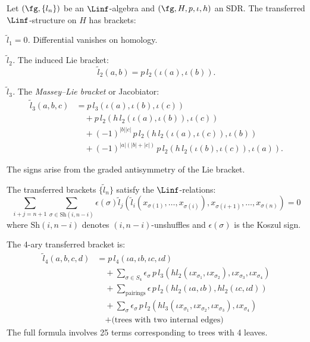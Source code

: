 \begin{construction}
\label{constr:htt-linf}
Let $(\fg, \{l_n\})$ be an $\Linf$-algebra and $(\fg, H, p, \iota, h)$ an SDR.
The transferred $\Linf$-structure on $H$ has brackets:

\emph{$\tilde{l}_1 = 0$.} Differential vanishes on homology.

\emph{$\tilde{l}_2$.} The induced Lie bracket:
\[
\tilde{l}_2(a, b) = p \, l_2(\iota(a), \iota(b)).
\]

\emph{$\tilde{l}_3$.} The \emph{Massey--Lie bracket} or Jacobiator:
\begin{align*}
\tilde{l}_3(a, b, c) &= p \, l_3(\iota(a), \iota(b), \iota(c)) \\
&\quad + p \, l_2(h \, l_2(\iota(a), \iota(b)), \iota(c)) \\
&\quad + (-1)^{|b||c|} \, p \, l_2(h \, l_2(\iota(a), \iota(c)), \iota(b)) \\
&\quad + (-1)^{|a|(|b|+|c|)} \, p \, l_2(h \, l_2(\iota(b), \iota(c)), \iota(a)).
\end{align*}

The signs arise from the graded antisymmetry of the Lie bracket.
\end{construction}

\begin{proposition}
\label{prop:linf-relations}
The transferred brackets $\{\tilde{l}_n\}$ satisfy the $\Linf$-relations:
\[
\sum_{i+j = n+1} \sum_{\sigma \in \mathrm{Sh}(i, n-i)} \epsilon(\sigma)
\tilde{l}_j(\tilde{l}_i(x_{\sigma(1)}, \ldots, x_{\sigma(i)}), x_{\sigma(i+1)}, \ldots, x_{\sigma(n)}) = 0
\]
where $\mathrm{Sh}(i, n-i)$ denotes $(i, n-i)$-unshuffles and $\epsilon(\sigma)$
is the Koszul sign.
\end{proposition}

\begin{computation}
\label{comp:l4-formula}
The 4-ary transferred bracket is:
\begin{align*}
\tilde{l}_4(a, b, c, d) &= p \, l_4(\iota a, \iota b, \iota c, \iota d) \\
&\quad + \sum_{\sigma \in S_4} \epsilon_\sigma \, p \, l_3(h l_2(\iota x_{\sigma_1}, \iota x_{\sigma_2}), \iota x_{\sigma_3}, \iota x_{\sigma_4}) \\
&\quad + \sum_{\text{pairings}} \epsilon \, p \, l_2(h l_2(\iota a, \iota b), h l_2(\iota c, \iota d)) \\
&\quad + \sum_{\sigma} \epsilon_\sigma \, p \, l_2(h l_3(\iota x_{\sigma_1}, \iota x_{\sigma_2}, \iota x_{\sigma_3}), \iota x_{\sigma_4}) \\
&\quad + \text{(trees with two internal edges)}
\end{align*}
The full formula involves 25 terms corresponding to trees with 4 leaves.
\end{computation}

